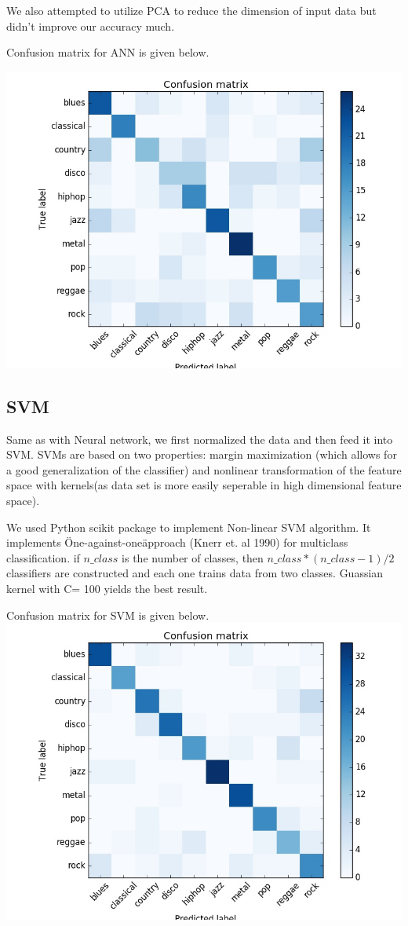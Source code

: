 \documentclass[conference]{IEEEtran}
\begin{document}
We also attempted to utilize PCA to reduce the dimension of input data but didn't improve our accuracy much.

Confusion matrix for ANN is given below.

\includegraphics[width=\columnwidth]{ANN}
\subsection{SVM}
\label{subs:Non-Linear SVM}
Same as with Neural network, we first normalized the data and then feed it into SVM. SVMs are based on two properties: margin maximization (which allows for a good generalization of the classifier) and nonlinear transformation of the feature space with kernels(as data set is more easily seperable in high dimensional feature space).


We used Python scikit package to implement Non-linear SVM algorithm. It implements \"One-against-one\" approach (Knerr et. al 1990) for multiclass classification. if $n{\_}class$ is the number of classes, then $n{\_}class * (n{\_}class - 1 ) / 2$ classifiers are constructed and each one trains data from two classes. Guassian kernel with C= 100 yields the best result.

Confusion matrix for SVM is given below.
\includegraphics[width=\columnwidth]{SVM}
\end{document}
